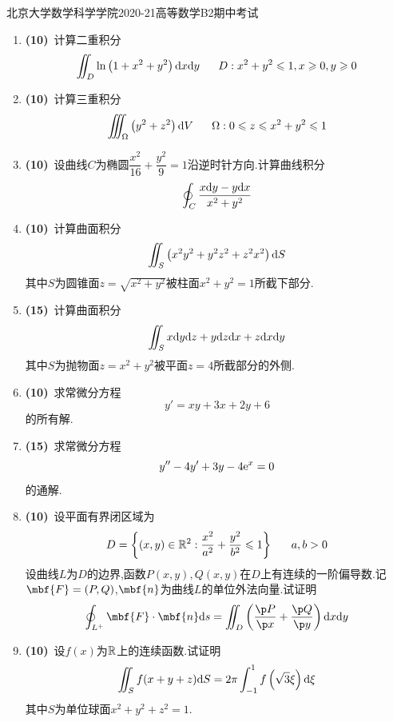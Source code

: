 \documentclass{ctexart}
\begin{document}
\pagestyle{empty}
\begin{center}\Large
    北京大学数学科学学院2020-21高等数学B2期中考试
\end{center}
\begin{enumerate}[leftmargin=*,label=\textbf{\arabic*.}]
    \item \textbf{(10)}\ 计算二重积分
    \[\iint_{D}\ln\left(1+x^2+y^2\right)\dx\di y\ \ \ \ \ D:x^2+y^2\leqslant1,x\geqslant0,y\geqslant0\]

    \item \textbf{(10)}\ 计算三重积分
    \[\iiint_{\Omega}\left(y^2+z^2\right)\di V\ \ \ \ \ \Omega:0\leqslant z\leqslant x^2+y^2\leqslant1\]

    \item \textbf{(10)}\ 设曲线$C$为椭圆$\dfrac{x^2}{16}+\dfrac{y^2}{9}=1$沿逆时针方向.计算曲线积分
    \[\oint_{C}\dfrac{x\mathrm{d} y-y\mathrm{d} x}{x^2+y^2}\]

    \item \textbf{(10)}\ 计算曲面积分
    \[\iint_{S}\left(x^2y^2+y^2z^2+z^2x^2\right)\mathrm{d} S\]
    其中$S$为圆锥面$z=\sqrt{x^2+y^2}$被柱面$x^2+y^2=1$所截下部分.

    \item \textbf{(15)}\ 计算曲面积分
    \[\iint_Sx\mathrm{d} y\mathrm{d} z+y\mathrm{d} z\mathrm{d} x+z\mathrm{d} x\mathrm{d} y\]
    其中$S$为抛物面$z=x^2+y^2$被平面$z=4$所截部分的外侧.

    \item \textbf{(10)}\ 求常微分方程
    \[y'=xy+3x+2y+6\]
    的所有解.

    \item \textbf{(15)}\ 求常微分方程
    \[y''-4y'+3y-4\mathrm{e}^x=0\]
    的通解.

    \item \textbf{(10)}\ 设平面有界闭区域为
    \[D=\left\{(x,y)\in\R^2:\dfrac{x^2}{a^2}+\dfrac{y^2}{b^2}\leqslant1\right\}\ \ \ \ \ a,b>0\]
    设曲线$L$为$D$的边界,函数$P(x,y),Q(x,y)$在$D$上有连续的一阶偏导数.记$\mbf{F}=(P,Q)$,$\mbf{n}$为曲线$L$的单位外法向量.试证明
    \[\oint_{L^+}\mbf{F}\cdot\mbf{n}\di s=\iint_{D}\left(\dfrac{\p P}{\p x}+\dfrac{\p Q}{\p y}\right)\di x\di y\]

    \item \textbf{(10)}\ 设$f(x)$为$\mathbb{R}$上的连续函数.试证明
    \[\iint_{S}f(x+y+z)\mathrm{d} S=2\pi\int_{-1}^{1}f\left(\sqrt{3}\xi\right)\mathrm{d}\xi\]
    其中$S$为单位球面$x^2+y^2+z^2=1$.

\end{enumerate}
\end{document}
